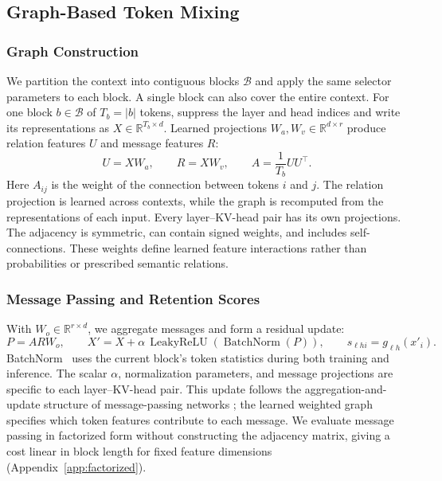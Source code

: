 \subsection{Graph-Based Token Mixing}
\label{sec:mixing}

\subsubsection{Graph Construction}

We partition the context into contiguous blocks $\mathcal{B}$ and apply the same selector parameters to each block. A single block can also cover the entire context. For one block $b\in\mathcal{B}$ of $T_b=|b|$ tokens, suppress the layer and head indices and write its representations as $X\in\mathbb{R}^{T_b\times d}$. Learned projections $W_a,W_v\in\mathbb{R}^{d\times r}$ produce relation features $U$ and message features $R$:
\begin{equation}
    U=XW_a,\qquad R=XW_v,\qquad A=\frac{1}{T_b}UU^{\top}.
    \label{eq:graph}
\end{equation}
Here $A_{ij}$ is the weight of the connection between tokens $i$ and $j$. The relation projection is learned across contexts, while the graph is recomputed from the representations of each input. Every layer--KV-head pair has its own projections. The adjacency is symmetric, can contain signed weights, and includes self-connections. These weights define learned feature interactions rather than probabilities or prescribed semantic relations.

\subsubsection{Message Passing and Retention Scores}

With $W_o\in\mathbb{R}^{r\times d}$, we aggregate messages and form a residual update:
\begin{equation}
    P=ARW_o,\qquad
    X'=X+\alpha\,\operatorname{LeakyReLU}\!\left(\operatorname{BatchNorm}(P)\right),\qquad
    s_{\ell h i}=g_{\ell h}(x'_i).
    \label{eq:mixer}
\end{equation}
BatchNorm~\citep{ioffe2015batchnorm} uses the current block's token statistics during both training and inference. The scalar $\alpha$, normalization parameters, and message projections are specific to each layer--KV-head pair. This update follows the aggregation-and-update structure of message-passing networks \citep{gilmer2017mpnn,xu2019gin}; the learned weighted graph specifies which token features contribute to each message. We evaluate message passing in factorized form without constructing the adjacency matrix, giving a cost linear in block length for fixed feature dimensions (Appendix~\ref{app:factorized}).

